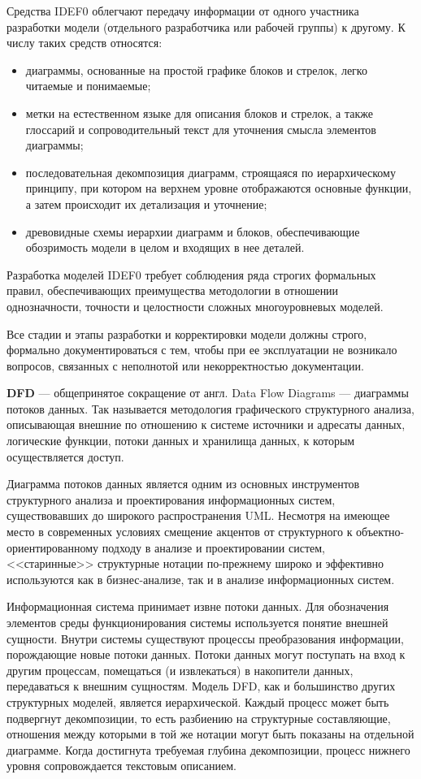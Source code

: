Средства IDEF0 облегчают передачу информации от одного
участника разработки модели (отдельного разработчика или рабочей группы)
к другому. К числу таких средств относятся:
\begin{itemize}
\item диаграммы, основанные на простой графике блоков и стрелок, легко
читаемые и понимаемые;
\item метки на естественном языке для описания блоков и стрелок, а также
глоссарий и сопроводительный текст для уточнения смысла
элементов диаграммы;
\item последовательная декомпозиция диаграмм, строящаяся по
иерархическому принципу, при котором на верхнем уровне
отображаются основные функции, а затем происходит их
детализация и уточнение;
\item древовидные схемы иерархии диаграмм и блоков, обеспечивающие
обозримость модели в целом и входящих в нее деталей.
\end{itemize}

Разработка моделей IDEF0 требует соблюдения
ряда строгих формальных правил, обеспечивающих преимущества
методологии в отношении однозначности, точности и целостности сложных
многоуровневых моделей.

Все стадии и этапы разработки и корректировки
модели должны строго, формально документироваться с тем, чтобы при ее
эксплуатации не возникало вопросов, связанных с неполнотой или
некорректностью документации.

\textbf{DFD} --- общепринятое сокращение от англ. Data Flow Diagrams ---
диаграммы потоков данных. Так называется методология графического
структурного анализа, описывающая внешние по отношению к системе
источники и адресаты данных, логические функции, потоки данных и
хранилища данных, к которым осуществляется доступ.

Диаграмма потоков данных является одним из
основных инструментов структурного анализа и проектирования
информационных систем, существовавших до широкого распространения
UML.
Несмотря на имеющее место в современных условиях смещение
акцентов от структурного к объектно-ориентированному подходу в анализе и
проектировании систем, <<старинные>> структурные нотации по-прежнему
широко и эффективно используются как в бизнес-анализе, так и в анализе
информационных систем.

Информационная система принимает извне потоки данных. Для
обозначения элементов среды функционирования системы используется
понятие внешней сущности. Внутри системы существуют процессы
преобразования информации, порождающие новые потоки данных.
Потоки данных могут поступать на вход к другим процессам, помещаться (и
извлекаться) в накопители данных, передаваться к внешним сущностям.
Модель DFD, как и большинство других структурных моделей, является
иерархической. Каждый процесс может быть подвергнут
декомпозиции, то есть разбиению на структурные составляющие, отношения
между которыми в той же нотации могут быть показаны на отдельной
диаграмме. Когда достигнута требуемая глубина декомпозиции, процесс
нижнего уровня сопровождается текстовым описанием.


